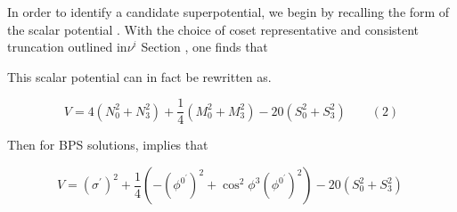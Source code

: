 \documentclass{article}
\begin{document}
In order to identify a candidate superpotential, we begin by recalling the form of the scalar
potential . With the choice of coset representative and consistent truncation outlined in$\nu ^ { i }$
Section , one finds that


This scalar potential can in fact be rewritten as.


\begin{equation}
V = 4 ( N _ { 0 } ^ { 2 } + N _ { 3 } ^ { 2 } ) + \frac { 1 } { 4 } ( M _ { 0 } ^ { 2 } + M _ { 3 } ^ { 2 } ) - 2 0 ( S _ { 0 } ^ { 2 } + S _ { 3 } ^ { 2 } ) \qquad ( 2 )
\end{equation}


Then for BPS solutions, implies that


\begin{equation}
V = ( \sigma ^ { \prime } ) ^ { 2 } + \frac { 1 } { 4 } \left ( - ( \phi ^ { 0 ^ { \prime } } ) ^ { 2 } + \cos ^ { 2 } \phi ^ { 3 } ( \phi ^ { 0 ^ { \prime } } ) ^ { 2 } \right ) - 2 0 ( S _ { 0 } ^ { 2 } + S _ { 3 } ^ { 2 } ) ~
\end{equation}
\end{document}
